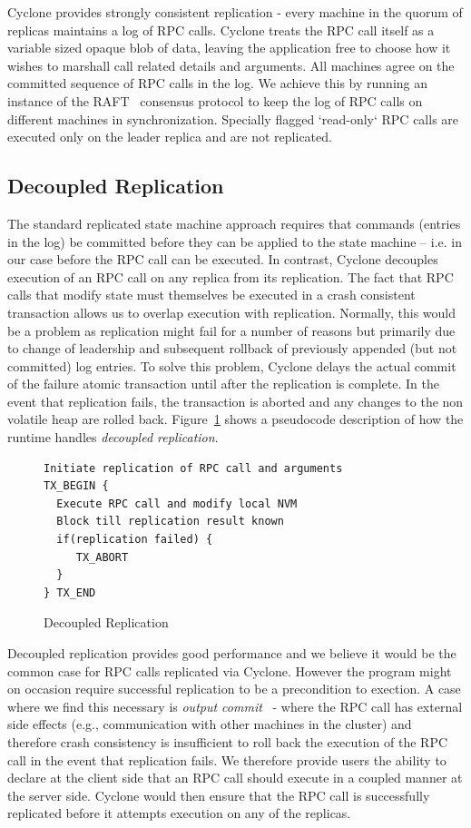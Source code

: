 \documentclass[letterpaper,twocolumn,10pt]{article}
\begin{document}
Cyclone provides strongly consistent replication - every machine in the quorum
of replicas maintains a log of RPC calls. Cyclone treats the RPC call itself as
a variable sized opaque blob of data, leaving the application free to choose how
it wishes to marshall call related details and arguments. All machines agree on
the committed sequence of RPC calls in the log. We achieve this by running an
instance of the RAFT~\cite{raft} consensus protocol to keep the log of RPC calls
on different machines in synchronization. Specially flagged `read-only` RPC
calls are executed only on the leader replica and are not replicated.

\subsection{Decoupled Replication}
\label{sec:decouple}
The standard replicated state machine approach requires that commands (entries
in the log) be committed before they can be applied to the state machine --
i.e. in our case before the RPC call can be executed. In contrast, Cyclone
decouples execution of an RPC call on any replica from its replication.
The fact that RPC calls that modify state must themselves be executed
in a crash consistent transaction allows us to overlap execution with
replication. Normally, this would be a problem as replication might fail for a
number of reasons but primarily due to change of leadership and subsequent
rollback of previously appended (but not committed) log entries. To solve this
problem, Cyclone delays the actual commit of the failure atomic transaction
until after the replication is complete. In the event that replication fails,
the transaction is aborted and any changes to the non volatile heap are rolled
back. Figure~\ref{fig:async_rep} shows a pseudocode description of how the
runtime handles \emph{decoupled replication}.

\begin{figure}
{ \scriptsize
\begin{verbatim}
Initiate replication of RPC call and arguments 
TX_BEGIN { 
  Execute RPC call and modify local NVM 
  Block till replication result known 
  if(replication failed) {
     TX_ABORT 
  } 
} TX_END
\end{verbatim}
}
\caption{Decoupled Replication}
\label{fig:async_rep}
\end{figure}

Decoupled replication provides good performance and we believe it would be
the common case for RPC calls replicated via Cyclone. However the program might 
on occasion require successful replication to be a precondition to exection.
A case where we find this necessary is
\textit{output commit}~\cite{output_commit} - where the RPC call has
external side effects (e.g., communication with other machines in the cluster)
and therefore crash consistency is insufficient to roll back the execution of
the RPC call in the event that replication fails. We therefore provide users the
ability to declare at the client side that an RPC call should execute
in a coupled manner at the server side. Cyclone would then ensure that the RPC
call is successfully replicated before it attempts execution on any of the
replicas.
\end{document}
